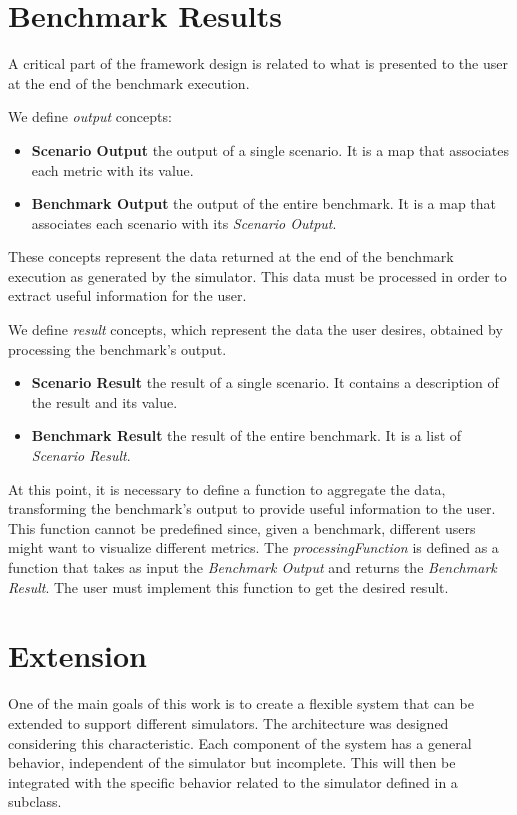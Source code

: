 \documentclass[12pt,a4paper,openright,twoside]{book}
\begin{document}
\section{Benchmark Results}

A critical part of the framework design is related to what is presented to the user at the end of the benchmark execution.

We define \emph{output} concepts:
\begin{itemize}
  \item \textbf{Scenario Output} the output of a single scenario. It is a map that associates each metric with its value.
  \item \textbf{Benchmark Output} the output of the entire benchmark. It is a map that associates each scenario with its \emph{Scenario Output}.
\end{itemize}

These concepts represent the data returned at the end of the benchmark execution as generated by the simulator.
This data must be processed in order to extract useful information for the user.

We define \emph{result} concepts, which represent the data the user desires, obtained by processing the benchmark's output.
\begin{itemize}
  \item \textbf{Scenario Result} the result of a single scenario. It contains a description of the result and its value.
  \item \textbf{Benchmark Result} the result of the entire benchmark. It is a list of \emph{Scenario Result}.
\end{itemize}

At this point, it is necessary to define a function to aggregate the data, transforming the benchmark's output to provide useful information to the user.
This function cannot be predefined since, given a benchmark, different users might want to visualize different metrics.
The \emph{processingFunction} is defined as a function that takes as input the \emph{Benchmark Output} and returns the \emph{Benchmark Result}.
The user must implement this function to get the desired result.

\section{Extension}

One of the main goals of this work is to create a flexible system that can be extended to support different simulators.
The architecture was designed considering this characteristic.
Each component of the system has a general behavior, independent of the simulator but incomplete.
This will then be integrated with the specific behavior related to the simulator defined in a subclass.
\end{document}
